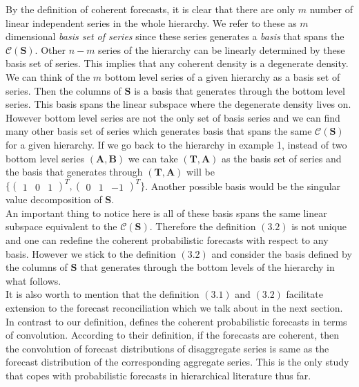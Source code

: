 \documentclass[a4paper, 11pt]{article}
\begin{document}
\noindent
By the definition of coherent forecasts, it is clear that there are only $m$ number of linear independent series in the whole hierarchy. We refer to these as $m$ dimensional \textit{basis set of series} since these series generates a \textit{basis} that spans the $\mathscr{C}(\bm{S})$. Other $n-m$ series of the hierarchy can be linearly determined by these basis set of series. This implies that any coherent density is a degenerate density. We can think of the $m$ bottom level series of a given hierarchy as a basis set of series. Then the columns of $\bm{S}$ is a basis that generates through the bottom level series. This basis spans the linear subspace where the degenerate density lives on.\\

\noindent
However bottom level series are not the only set of basis series and we can find many other basis set of series which generates basis that spans the same $\mathscr{C}(\bm{S})$ for a given hierarchy. If we go back to the hierarchy in example 1, instead of two bottom level series $(\bm{A,B})$ we can take $(\bm{T,A})$ as the basis set of series and the basis that generates through $(\bm{T,A})$ will be $\{\begin{pmatrix}
1&0&1 \end{pmatrix}^T, \begin{pmatrix}
0&1&-1 \end{pmatrix}^T\}$. Another possible basis would be the singular value decomposition of $\bm{S}$.\\

\noindent
An important thing to notice here is all of these basis spans the same linear subspace equivalent to the $\mathscr{C}(\bm{S})$. Therefore the definition $(3.2)$ is not unique and one can redefine the coherent probabilistic forecasts with respect to any basis. However we stick to the definition $(3.2)$ and consider the basis defined by the columns of $\bm{S}$ that generates through the bottom levels of the hierarchy in what follows.\\ 

\noindent
It is also worth to mention that the definition $(3.1)$ and $(3.2)$ facilitate extension to the forecast reconciliation which we talk about in the next section. In contrast to our definition, \citet{BenTaieb2017} defines the coherent probabilistic forecasts in terms of convolution. According to their definition, if the forecasts are coherent, then the convolution of forecast distributions of disaggregate series is same as the forecast distribution of the corresponding aggregate series. This is the only study that copes with probabilistic forecasts in hierarchical literature thus far. 
\end{document}
